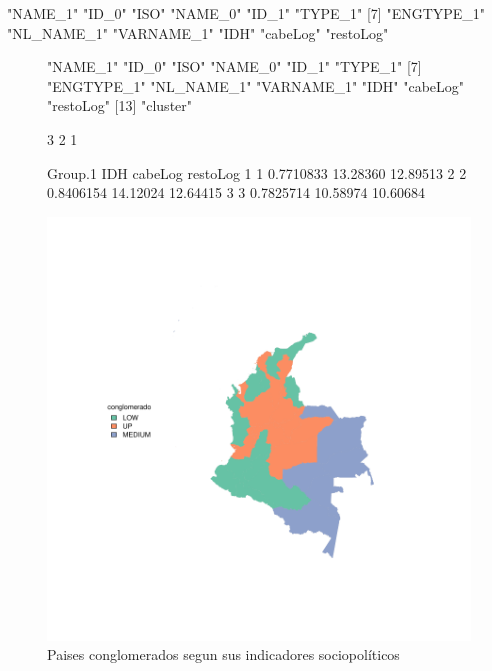 \documentclass{article}
\begin{document}
\begin{Schunk}
\begin{Soutput}
 [1] "NAME_1"    "ID_0"      "ISO"       "NAME_0"    "ID_1"      "TYPE_1"   
 [7] "ENGTYPE_1" "NL_NAME_1" "VARNAME_1" "IDH"       "cabeLog"   "restoLog" 
\end{Soutput}
\end{Schunk}



\begin{figure}[h]
\centering

\begin{Schunk}
\begin{Soutput}
 [1] "NAME_1"    "ID_0"      "ISO"       "NAME_0"    "ID_1"      "TYPE_1"   
 [7] "ENGTYPE_1" "NL_NAME_1" "VARNAME_1" "IDH"       "cabeLog"   "restoLog" 
[13] "cluster"  
\end{Soutput}
\begin{Soutput}
[1] 3 2 1
\end{Soutput}
\begin{Soutput}
  Group.1       IDH  cabeLog restoLog
1       1 0.7710833 13.28360 12.89513
2       2 0.8406154 14.12024 12.64415
3       3 0.7825714 10.58974 10.60684
\end{Soutput}
\end{Schunk}
\includegraphics{FinaldeR2-plotMap1}

\caption{Paises conglomerados segun sus indicadores sociopol\'iticos}\label{clustmap}
\end{figure}


\renewcommand{\refname}{Bibliografia}

\end{document}

